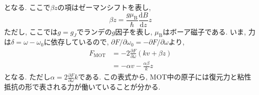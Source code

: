 \documentclass[uplatex, dvipdfmx, a4paper, report, papersize, 11pt]{jsbook}
\begin{document}
となる. ここで$\beta z$の項はゼーマンシフトを表し,
\begin{equation}
  \beta z = \frac { g \mu _ { \mathrm { B } } } { \hbar } \frac { \mathrm { d } B } { \mathrm { d } z } z
\end{equation}
ただし, ここでは$g = g _ { J }$でランデの$g$因子を表し, $\mu _ { \mathrm { B }}$はボーア磁子である. いま, 力は$\delta = \omega - \omega _ { 0 }$に依存しているので, $\partial F / \partial \omega _ { 0 } = - \partial F / \partial \omega$より,
\begin{equation}
  \begin{aligned} F _ { \mathrm { MOT } } & = - 2 \frac { \partial F } { \partial \omega } ( k v + \beta z ) \\ & = - \alpha v - \frac { \alpha \beta } { k } z \end{aligned}
\end{equation}
となる. ただし$\alpha = 2\frac{\partial F}{\partial \omega} k$である. この表式から, MOT中の原子には復元力と粘性抵抗の形で表される力が働いていることが分かる.
\newpage
\end{document}
